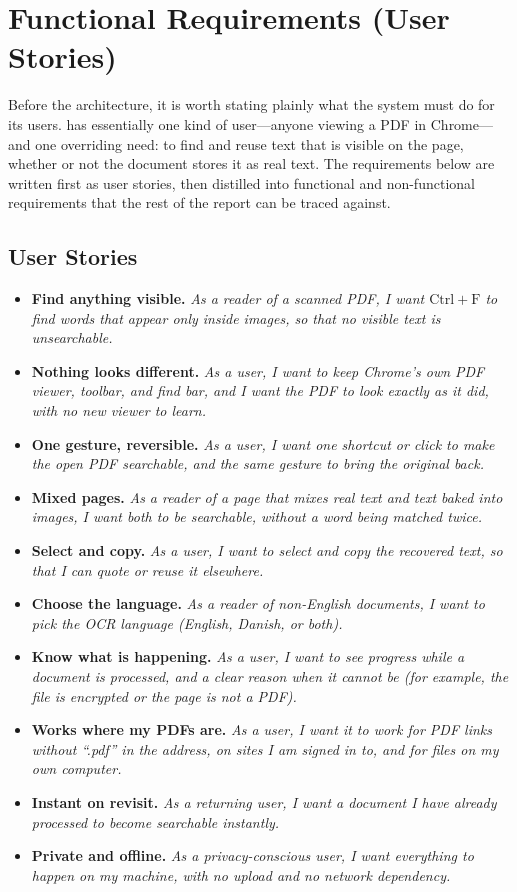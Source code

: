 \section{Functional Requirements (User Stories)}
\label{sec:requirements}

Before the architecture, it is worth stating plainly what the system must do for
its users. \proj{} has essentially one kind of user---anyone viewing a PDF in
Chrome---and one overriding need: to find and reuse text that is visible on the
page, whether or not the document stores it as real text. The requirements below
are written first as user stories, then distilled into functional and
non-functional requirements that the rest of the report can be traced against.

\subsection{User Stories}
\begin{itemize}
  \item \textbf{Find anything visible.} \emph{As a reader of a scanned PDF, I
        want $\mathrm{Ctrl}{+}\mathrm{F}$ to find words that appear only inside
        images, so that no visible text is unsearchable.}
  \item \textbf{Nothing looks different.} \emph{As a user, I want to keep
        Chrome's own PDF viewer, toolbar, and find bar, and I want the PDF to
        look exactly as it did, with no new viewer to learn.}
  \item \textbf{One gesture, reversible.} \emph{As a user, I want one shortcut or
        click to make the open PDF searchable, and the same gesture to bring the
        original back.}
  \item \textbf{Mixed pages.} \emph{As a reader of a page that mixes real text
        and text baked into images, I want both to be searchable, without a word
        being matched twice.}
  \item \textbf{Select and copy.} \emph{As a user, I want to select and copy the
        recovered text, so that I can quote or reuse it elsewhere.}
  \item \textbf{Choose the language.} \emph{As a reader of non-English documents,
        I want to pick the OCR language (English, Danish, or both).}
  \item \textbf{Know what is happening.} \emph{As a user, I want to see progress
        while a document is processed, and a clear reason when it cannot be
        (for example, the file is encrypted or the page is not a PDF).}
  \item \textbf{Works where my PDFs are.} \emph{As a user, I want it to work for
        PDF links without ``.pdf'' in the address, on sites I am signed in to,
        and for files on my own computer.}
  \item \textbf{Instant on revisit.} \emph{As a returning user, I want a document
        I have already processed to become searchable instantly.}
  \item \textbf{Private and offline.} \emph{As a privacy-conscious user, I want
        everything to happen on my machine, with no upload and no network
        dependency.}
\end{itemize}

